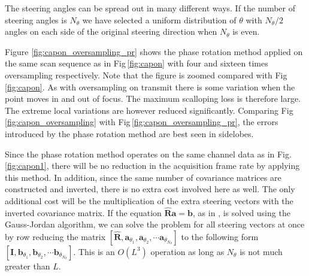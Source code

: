 \documentclass[draftcls]{IEEEtran}
\newcommand{\mat}[1]{\mathbf{#1}}
\renewcommand{\vec}[1]{\mathbf{#1}}
\newcommand{\img}{img/}
\begin{document}
The steering angles can be spread out in many different ways. If the number of steering angles is $N_\theta$ we have selected a uniform distribution of $\theta$  with $N_\theta/2$ angles on each side of the original steering direction when $N_\theta$ is even.%

Figure \ref{fig:capon_oversampling_pr} shows the phase rotation method applied on the same scan sequence as in Fig\,\ref{fig:capon} with four and sixteen times oversampling respectively. Note that the figure is zoomed compared with Fig\,\ref{fig:capon}. As with oversampling on transmit there is some variation when the point moves in and out of focus. The maximum scalloping loss is therefore large. The extreme local variations are however reduced significantly. Comparing Fig\,\ref{fig:capon_oversampling} with Fig\,\ref{fig:capon_oversampling_pr}, the errors introduced by the phase rotation method are best seen in sidelobes.  

Since the phase rotation method operates on the same channel data as in Fig.\,\ref{fig:capon1}, there will be no reduction in the acquisition frame rate by applying this method. In addition, since the same number of covariance matrices are constructed and inverted, there is no extra cost involved here as well. The only additional cost will be the multiplication of the extra steering vectors with the inverted covariance matrix. If the equation $\mat{\hat{R}}\vec{a} = \vec{b}$, as in \cite{Asen}, is solved using the Gauss-Jordan algorithm, we can solve the problem for all steering vectors at once by row reducing the matrix $[\mat{\hat{R}},  \vec{a}_{\theta_1}, \vec{a}_{\theta_2}, \cdots \vec{a}_{\theta_{N_\theta}}]$ to the following form $[\mat{I},  \vec{b}_{\theta_1}, \vec{b}_{\theta_2}, \cdots \vec{b}_{\theta_{N_\theta}}]$. This is an $O(L^3)$ operation as long as $N_\theta$ is not much greater than $L$.

\begin{figure*}[!t]
	\centerline{
	}
	\caption{Capon beamforming as described in Fig\,\ref{fig:capon} with oversampling based on phase rotation. The figure is zoomed compared with Fig\,\ref{fig:capon} to better see the beam-to-beam variation. a) Four times oversampling. b) Sixteen times oversampling.}
	\label{fig:capon_oversampling_pr}
\end{figure*}
\end{document}
